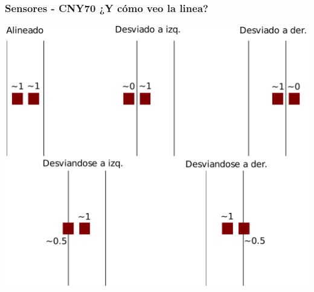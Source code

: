 \documentclass[compress]{beamer}
\begin{document}
\begin{frame}[fragile]
\begin{columns}
\begin{center}
\end{center}
\end{columns}
\end{frame}

\begin{frame}
\frametitle{Sensores - CNY70 ¿Y cómo veo la linea?}
\begin{center}
 \includegraphics[height=0.8\textheight]{./img/sensores_image.pdf}
\end{center}
\end{frame}
\end{document}
